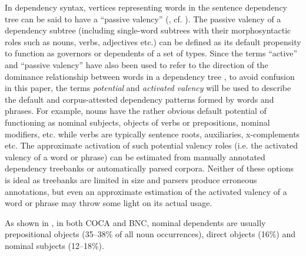 \documentclass[output=paper]{langscibook}
\begin{document}
In dependency syntax, vertices representing words in the sentence dependency tree can be said to have a ``passive valency'' (\citealt{Melʹčuk1988}, cf. \citealt{Boguslavsky2003,Boguslavsky2016,Boguslavsky2003}). The passive valency of a dependency subtree (including single-word subtrees with their morphosyntactic roles such as nouns, verbs, adjectives etc.) can be defined as its default propensity to function as governors or dependents of a set of types. Since the terms ``active'' and ``passive valency'' have also been used to refer to the direction of the dominance relationship between words in a dependency tree \citep{Moroz2013}, to avoid confusion in this paper, the terms \textit{potential} and \textit{activated valency} will be used to describe the default and corpus-attested dependency patterns formed by words and phrases. For example, nouns have the rather obvious default potential of functioning as nominal subjects, objects of verbs or prepositions, nominal modifiers, etc. while verbs are typically sentence roots, auxiliaries, x-complements etc. The approximate activation of such potential valency roles  (i.e. the activated valency of a word or phrase) can be estimated from manually annotated dependency treebanks or automatically parsed corpora. Neither of these options is ideal as treebanks are limited in size and parsers produce erroneous annotations, but even an approximate estimation of the activated valency of a word or phrase may throw some light on its actual usage.

As shown in , in both COCA and BNC, nominal dependents are usually prepositional objects (35--38\% of all noun occurrences), direct objects (16\%) and nominal subjects (12--18\%).
\end{document}
